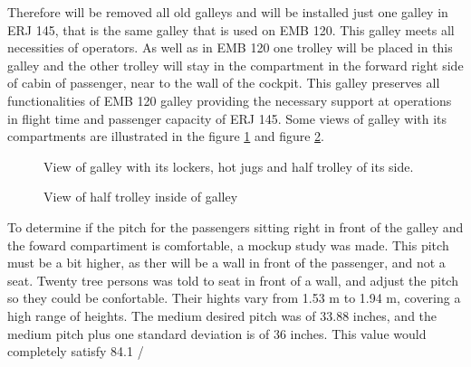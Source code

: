 	Therefore will be removed all old galleys and will be installed just one galley in ERJ 145, that is the same galley that is used on EMB 120. This galley meets all necessities of operators. As well as in EMB 120 one trolley will be placed in this galley and the other trolley will stay in the compartment in the forward right side of cabin of passenger, near to the wall of the cockpit. This galley preserves all functionalities of EMB 120 galley providing the necessary support at operations in flight time and passenger capacity of ERJ 145. Some views of galley with its compartments are illustrated in the figure \ref{fig:InteriorArrangements} and figure \ref{fig:viewhalftrolley}.

\begin{figure}[H]
\caption{View of galley with its lockers, hot jugs and half trolley of its side.}
\label{fig:InteriorArrangements}
\end{figure}



\begin{figure}[H]
\caption{View of half trolley inside of galley}
\label{fig:viewhalftrolley}
\end{figure}

	To determine if the pitch for the passengers sitting right in front of the galley and the foward compartiment is comfortable, a mockup study was made. This pitch must be a bit higher, as ther will be a wall in front of the passenger, and not a seat. Twenty tree persons was told to seat in front of a wall, and adjust the pitch so they could be confortable. Their hights vary from 1.53 m to 1.94 m, covering a high range of heights. The medium desired pitch was of 33.88 inches, and the medium pitch plus one standard deviation is of 36 inches. This value would completely satisfy 84.1 /%


